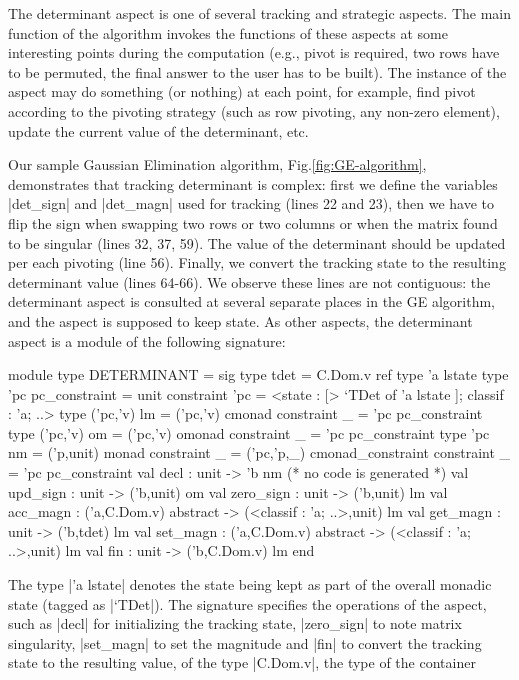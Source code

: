 \documentclass{elsart}
\begin{document}
The determinant aspect is one of several tracking and strategic
aspects. The main function of the algorithm invokes the functions of
these aspects at some interesting points during the computation (e.g.,
pivot is required, two rows have to be permuted, the final answer to the
user has to be built). The instance of the aspect may do something (or
nothing) at each point, for example, find pivot according to the
pivoting strategy (such as row pivoting, any non-zero element), update
the current value of the determinant, etc.

Our sample Gaussian Elimination algorithm, Fig.\ref{fig:GE-algorithm},
demonstrates that tracking determinant is complex: first we define the
variables |det_sign| and |det_magn| used for tracking (lines 22 and
23), then we have to flip the sign when swapping two rows or two
columns or when the matrix found to be singular (lines 32, 37, 59).
The value of the determinant should be updated per each pivoting (line
56). Finally, we convert the tracking state to the resulting
determinant value (lines 64-66). We observe these lines are not
contiguous: the determinant aspect is consulted at several separate
places in the GE algorithm, and the aspect is supposed to keep
state. As other aspects, the determinant aspect is a module of the
following signature:
\begin{code}
module type DETERMINANT = sig
  type tdet = C.Dom.v ref
  type 'a lstate
  type 'pc pc_constraint = unit
    constraint 'pc = <state : [> `TDet of 'a lstate ]; classif : 'a; ..>
  type ('pc,'v) lm = ('pc,'v) cmonad
    constraint _  = 'pc pc_constraint
  type ('pc,'v) om = ('pc,'v) omonad
    constraint _  = 'pc pc_constraint
  type 'pc nm = ('p,unit) monad
    constraint _ = ('pc,'p,_) cmonad_constraint
    constraint _ = 'pc pc_constraint
  val decl : unit -> 'b nm (* no code is generated *)
  val upd_sign  : unit -> ('b,unit) om
  val zero_sign : unit -> ('b,unit) lm
  val acc_magn  : ('a,C.Dom.v) abstract -> (<classif : 'a; ..>,unit) lm
  val get_magn  : unit -> ('b,tdet) lm
  val set_magn  : ('a,C.Dom.v) abstract -> (<classif : 'a; ..>,unit) lm
  val fin       : unit -> ('b,C.Dom.v) lm
end
\end{code}
The type |'a lstate| denotes the state being kept as part of the
overall monadic state (tagged as |`TDet|). The signature specifies the
operations of the aspect, such as |decl| for initializing the tracking
state, |zero_sign| to note matrix singularity, |set_magn| to set the
magnitude and |fin| to convert the tracking state to the resulting
value, of  the type |C.Dom.v|, the type of the container
\end{document}
